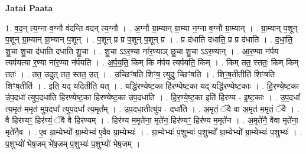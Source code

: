 \documentclass[17pt]{extarticle}
\begin{document}
\textbf{Jatai Paata} \newline

1. व॒द॒न् त्य॒ग्ना व॒ग्नौ व॑दन्ति वदन् त्य॒ग्नौ । . अ॒ग्नौ ग्रा॒म्यान् ग्रा॒म्या न॒ग्ना व॒ग्नौ ग्रा॒म्यान् । . ग्रा॒म्यान् प॒शून् प॒शून् ग्रा॒म्यान् ग्रा॒म्यान् प॒शून् । . प॒शून् प्र प्र प॒शून् प॒शून् प्र । . प्र द॑धाति दधाति॒ प्र प्र द॑धाति । . द॒धा॒ति॒ शु॒चा शु॒चा द॑धाति दधाति शु॒चा । . शु॒चा ऽऽर॒ण्या ना॑र॒ण्याञ् छु॒चा शु॒चा ऽऽर॒ण्यान् । . आ॒र॒ण्या न॑र्पय त्यर्पयत्या र॒ण्या ना॑र॒ण्या न॑र्पयति । . अ॒र्प॒य॒ति॒ किम् कि म॑र्पय त्यर्पयति॒ किम् । . किम् तत॒ स्ततः॒ किम् किम् ततः॑ । . तत॒ उदुत् तत॒ स्तत॒ उत् । . उच्छिꣳ॑षति शिꣳष॒ त्युदु च्छिꣳ॑षति । . शिꣳ॒॒ष॒तीतीति॑ शिꣳषति शिꣳष॒तीति॑ । . इति॒ यद् यदितीति॒ यत् । . यद्धि॑रण्येष्ट॒का हि॑रण्येष्ट॒का यद् यद्धि॑रण्येष्ट॒काः । . हि॒र॒ण्ये॒ष्ट॒का उ॑प॒दधा᳚ त्युप॒दधा॑ति हिरण्येष्ट॒का हि॑रण्येष्ट॒का उ॑प॒दधा॑ति । . हि॒र॒ण्ये॒ष्ट॒का इति॑ हिरण्य - इ॒ष्ट॒काः । . उ॒प॒दधा᳚ त्य॒मृत॑ म॒मृत॑ मुप॒दधा᳚ त्युप॒दधा᳚ त्य॒मृत᳚म् । . उ॒प॒दधा॒तीत्यु॑प - दधा॑ति । . अ॒मृतं॒ ॅवै वा अ॒मृत॑ म॒मृतं॒ ॅवै । . वै हिर॑ण्यꣳ॒॒ हिर॑ण्यं॒ ॅवै वै हिर॑ण्यम् । . हिर॑ण्य म॒मृते॑ना॒ मृते॑न॒ हिर॑ण्यꣳ॒॒ हिर॑ण्य म॒मृते॑न । . अ॒मृते॑नै॒ वैवा मृते॑ना॒ मृते॑नै॒व । . ए॒व ग्रा॒म्येभ्यो᳚ ग्रा॒म्येभ्य॑ ए॒वैव ग्रा॒म्येभ्यः॑ । . ग्रा॒म्येभ्यः॑ प॒शुभ्यः॑ प॒शुभ्यो᳚ ग्रा॒म्येभ्यो᳚ ग्रा॒म्येभ्यः॑ प॒शुभ्यः॑ । . प॒शुभ्यो॑ भेष॒जम् भे॑ष॒जम् प॒शुभ्यः॑ प॒शुभ्यो॑ भेष॒जम् । \newline
\end{document}
